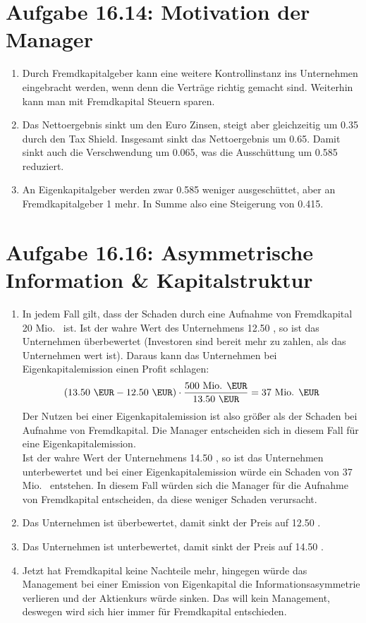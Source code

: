 \documentclass{article}
\begin{document}
	\section*{Aufgabe 16.14: Motivation der Manager}
	\begin{enumerate}[label=(\alph*)]
		\item Durch Fremdkapitalgeber kann eine weitere Kontrollinstanz ins Unternehmen eingebracht werden, wenn denn die Verträge richtig gemacht sind. Weiterhin kann man mit Fremdkapital Steuern sparen.
		\item Das Nettoergebnis sinkt um den Euro Zinsen, steigt aber gleichzeitig um 0.35 durch den Tax Shield. Insgesamt sinkt das Nettoergebnis um 0.65. Damit sinkt auch die Verschwendung um 0.065, was die Ausschüttung um 0.585 reduziert.
		\item An Eigenkapitalgeber werden zwar 0.585 weniger ausgeschüttet, aber an Fremdkapitalgeber 1 mehr. In Summe also eine Steigerung von 0.415.
	\end{enumerate}
	
	\section*{Aufgabe 16.16: Asymmetrische Information \& Kapitalstruktur}
	\begin{enumerate}[label=(\alph*)]
		\item In jedem Fall gilt, dass der Schaden durch eine Aufnahme von Fremdkapital 20 Mio. \EUR\, ist. Ist der wahre Wert des Unternehmens 12.50 \EUR, so ist das Unternehmen überbewertet (Investoren sind bereit mehr zu zahlen, als das Unternehmen wert ist). Daraus kann das Unternehmen bei Eigenkapitalemission einen Profit schlagen:
		\begin{align}
			(13.50\text{ \EUR} - 12.50\text{ \EUR})\cdot\frac{500\text{ Mio. \EUR}}{13.50\text{ \EUR}} = 37 \text{ Mio. \EUR} \notag
		\end{align}
		Der Nutzen bei einer Eigenkapitalemission ist also größer als der Schaden bei Aufnahme von Fremdkapital. Die Manager entscheiden sich in diesem Fall für eine Eigenkapitalemission. \\
		Ist der wahre Wert der Unternehmens 14.50 \EUR, so ist das Unternehmen unterbewertet und bei einer Eigenkapitalemission würde ein Schaden von 37 Mio. \EUR\, entstehen. In diesem Fall würden sich die Manager für die Aufnahme von Fremdkapital entscheiden, da diese weniger Schaden verursacht.
		\item Das Unternehmen ist überbewertet, damit sinkt der Preis auf 12.50 \EUR.
		\item Das Unternehmen ist unterbewertet, damit sinkt der Preis auf 14.50 \EUR.
		\item Jetzt hat Fremdkapital keine Nachteile mehr, hingegen würde das Management bei einer Emission von Eigenkapital die Informationsasymmetrie verlieren und der Aktienkurs würde sinken. Das will kein Management, deswegen wird sich hier immer für Fremdkapital entschieden.
	\end{enumerate}
	
\end{document}
